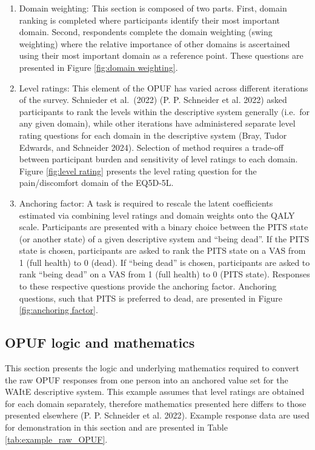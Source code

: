 \documentclass[
  letterpaper,
  DIV=11,
  numbers=noendperiod]{scrartcl}
\providecommand{\tightlist}{%
  \setlength{\itemsep}{0pt}\setlength{\parskip}{0pt}}\usepackage{longtable,booktabs,array}
\begin{document}
\begin{enumerate}
\def\labelenumi{\arabic{enumi}.}
\tightlist
\item
  Domain weighting: This section is composed of two parts. First, domain
  ranking is completed where participants identify their most important
  domain. Second, respondents complete the domain weighting (swing
  weighting) where the relative importance of other domains is
  ascertained using their most important domain as a reference point.
  These questions are presented in Figure \ref{fig:domain weighting}.
\item
  Level ratings: This element of the OPUF has varied across different
  iterations of the survey. Schnieder et al.~(2022) (P. P. Schneider et
  al. 2022) asked participants to rank the levels within the descriptive
  system generally (i.e.~for any given domain), while other iterations
  have administered separate level rating questions for each domain in
  the descriptive system (Bray, Tudor Edwards, and Schneider 2024).
  Selection of method requires a trade-off between participant burden
  and sensitivity of level ratings to each domain. Figure
  \ref{fig:level rating} presents the level rating question for the
  pain/discomfort domain of the EQ5D-5L.
\item
  Anchoring factor: A task is required to rescale the latent
  coefficients estimated via combining level ratings and domain weights
  onto the QALY scale. Participants are presented with a binary choice
  between the PITS state (or another state) of a given descriptive
  system and ``being dead''. If the PITS state is chosen, participants
  are asked to rank the PITS state on a VAS from 1 (full health) to 0
  (dead). If ``being dead'' is chosen, participants are asked to rank
  ``being dead'' on a VAS from 1 (full health) to 0 (PITS state).
  Responses to these respective questions provide the anchoring factor.
  Anchoring questions, such that PITS is preferred to dead, are
  presented in Figure \ref{fig:anchoring factor}.
\end{enumerate}

\subsection{OPUF logic and mathematics}\label{sec-OPUF_methods}

This section presents the logic and underlying mathematics required to
convert the raw OPUF responses from one person into an anchored value
set for the WAItE descriptive system. This example assumes that level
ratings are obtained for each domain separately, therefore mathematics
presented here differs to those presented elsewhere (P. P. Schneider et
al. 2022). Example response data are used for demonstration in this
section and are presented in Table \ref{tab:example_raw_OPUF}.
\end{document}
